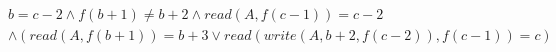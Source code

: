 \begin{align*}
%
& %
b = c - 2
%
\land
%
f(b + 1)  \neq  b + 2
%
\land
%
\mathit{read}(A,f(c - 1)) = c - 2
~\\~
& %
%
\land
%
(\mathit{read}(A,f(b + 1)) = b + 3 \lor \mathit{read}(\mathit{write}(A,b + 2,f(c - 2)),f(c - 1)) = c)
%
\end{align*}
